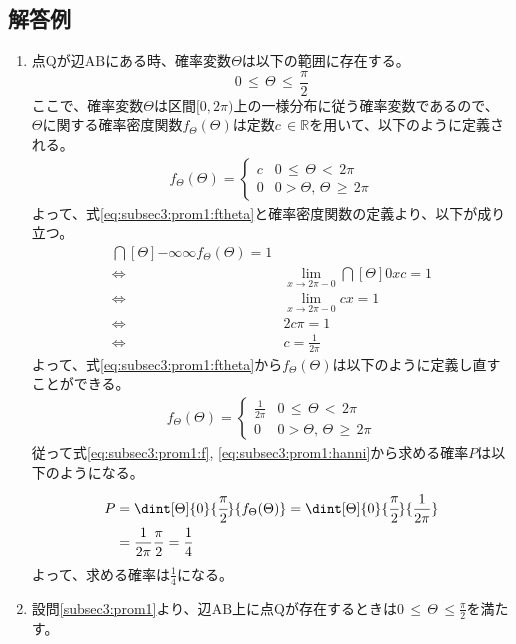 \newpage

\subsection{解答例}
\begin{enumerate}[(1)]
    \setlength{\itemsep}{10pt}
    \item 点$\mathrm{Q}$が辺$\mathrm{AB}$にある時、確率変数$\Theta$は以下の範囲に存在する。
    \begin{equation}
        0\, \leq\, \Theta\, \leq\, \frac{\pi}{2}\label{eq:subsec3:prom1:hanni}
    \end{equation}
    ここで、確率変数$\Theta$は区間$[0, 2\pi)$上の一様分布に従う確率変数であるので、
    $\Theta$に関する確率密度関数$f_{\Theta}(\Theta)$は定数$c\, \in \mathbb{R}$を用いて、以下のように定義される。
    \begin{align}
        f_{\Theta}(\Theta) = 
        \begin{cases}
            c & 0\, \leq\, \Theta\, <\, 2\pi\\
            0 & 0 > \Theta,\, \Theta\, \geq\, 2\pi
        \end{cases}\label{eq:subsec3:prom1:ftheta}
    \end{align}
    よって、式\eqref{eq:subsec3:prom1:ftheta}と確率密度関数の定義より、以下が成り立つ。
    \begin{align*}
        \dint[\Theta]{-\infty}{\infty}{f_{\Theta}(\Theta)} = 1\\
        \Longleftrightarrow\; &\lim_{x \to 2\pi-0}\dint[\Theta]{0}{x}{c} = 1\\
        \Longleftrightarrow\; &\lim_{x \to 2\pi-0}cx = 1\\
        \Longleftrightarrow\; &2c\pi = 1\\
        \Longleftrightarrow\; &c = \frac{1}{2\pi}
    \end{align*}
    よって、式\eqref{eq:subsec3:prom1:ftheta}から$f_{\Theta}(\Theta)$は以下のように定義し直すことができる。
    \begin{align}
        f_{\Theta}(\Theta) = 
        \begin{cases}
            \frac{1}{2\pi} & 0\, \leq\, \Theta\, <\, 2\pi\\
            0 & 0 > \Theta,\, \Theta\, \geq\, 2\pi
        \end{cases}\label{eq:subsec3:prom1:f}
    \end{align}
    従って式\eqref{eq:subsec3:prom1:f}, \eqref{eq:subsec3:prom1:hanni}から求める確率$P$は以下のようになる。
    \begin{align*}
        P &= \dint[\Theta]{0}{\cfrac{\pi}{2}}{f_{\Theta}(\Theta)} = \dint[\Theta]{0}{\cfrac{\pi}{2}}{\frac{1}{2\pi}}\\
        &= \frac{1}{2\pi}\frac{\pi}{2} = \frac{1}{4}
    \end{align*}
    よって、求める確率は$\frac{1}{4}$になる。
    \item 設問\eqref{subsec3:prom1}より、辺$\mathrm{AB}$上に点$\mathrm{Q}$が存在するときは$0\, \leq \, \Theta\, \leq \frac{\pi}{2}$を満たす。
   

\end{enumerate}
